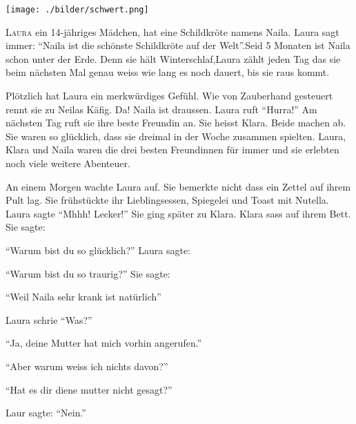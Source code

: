 ﻿\thispagestyle{empty}
\begin{center}
\texttt{[image: ./bilder/schwert.png]}
\end{center}
\vspace*{\fill}
{\centering\fontsize{50}{48} \color{farbe}\par}
{\centering\fontsize{20}{28} \color{farbe}\par}
\newpage
\lettrine[lines=3, lhang=.2, loversize=.25, lraise=0.05, findent=0.1em,
nindent=0em]{L}{aura} ein 14-jähriges Mädchen, hat eine Schildkröte namens Naila. Laura sagt immer: \enquote{Naila ist die schönste Schildkröte auf der Welt}.Seid 5 Monaten ist Naila schon unter der Erde. Denn sie hält Winterschlaf,Laura zählt jeden Tag das sie beim nächsten Mal genau weiss wie lang es noch dauert, bis sie raus kommt. 

Plötzlich hat Laura ein merkwürdiges Gefühl. Wie von Zauberhand gesteuert rennt sie zu Neilas Käfig. Da! Naila ist draussen. Laura ruft \enquote{Hurra!} Am nächsten Tag ruft sie ihre beste Freundin an. Sie heisst Klara. Beide machen ab. Sie waren so glücklich, dass sie dreimal in der Woche zusammen spielten. Laura, Klara und Naila waren die drei besten Freundinnen für immer und sie erlebten noch viele weitere Abenteuer.

An einem Morgen wachte Laura auf. Sie bemerkte nicht dass ein Zettel auf ihrem Pult lag. Sie frühstückte ihr Lieblingsessen, Spiegelei und Toast mit Nutella. Laura sagte \enquote{Mhhh! Lecker!} Sie ging später zu Klara. Klara sass auf ihrem Bett. Sie sagte: 

\enquote{Warum bist du so glücklich?} Laura sagte: 

\enquote{Warum bist du so traurig?} Sie sagte:

\enquote{Weil Naila sehr krank ist natürlich}

Laura schrie \enquote{Was?}

\enquote{Ja, deine Mutter hat mich vorhin angerufen.}

\enquote{Aber warum weiss ich nichts davon?}

\enquote{Hat es dir diene mutter nicht gesagt?}

Laur sagte: \enquote{Nein.}

